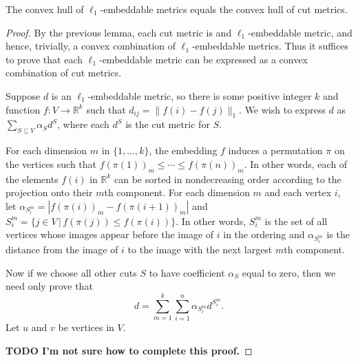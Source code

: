 \documentclass[11pt]{article}
\newcommand{\1}{\mathbf{1}}
\newcommand{\0}{\mathbf{0}}
\begin{document}
\begin{theorem}
  The convex hull of $\ell_1$-embeddable metrics equals the convex hull of cut metrics.
\end{theorem}
\begin{proof}
  By the previous lemma, each cut metric is and $\ell_1$-embeddable metric, and hence, trivially, a convex combination of $\ell_1$-embeddable metrics.
  Thus it suffices to prove that each $\ell_1$-embeddable metric can be expressed as a convex combination of cut metrics.

  Suppose $d$ is an $\ell_1$-embeddable metric, so there is some positive integer $k$ and function $f \colon V \to \mathbb{R}^k$ such that $d_{ij} = \|f(i) - f(j)\|_1$.
  We wish to express $d$ as $\sum_{S \subseteq V} \alpha_S d^S$, where each $d^S$ is the cut metric for $S$.

  For each dimension $m$ in $\{1, \dotsc, k\}$, the embedding $f$ induces a permutation $\pi$ on the vertices such that $f(\pi(1))_m \leq \dotsb \leq f(\pi(n))_m$.
  In other words, each of the elements $f(i)$ in $\mathbb{R}^k$ can be sorted in nondecreasing order according to the projection onto their $m$th component.
  For each dimension $m$ and each vertex $i$, let $\alpha_{S^m_i} = |f(\pi(i))_m - f(\pi(i + 1))_m|$ and $S^m_i = \{ j \in V \,|\, f(\pi(j)) \leq f(\pi(i)) \}$.
  In other words, $S^m_i$ is the set of all vertices whose images appear before the image of $i$ in the ordering and $\alpha_{S^m_i}$ is the distance from the image of $i$ to the image with the next largest $m$th component.

  Now if we choose all other cuts $S$ to have coefficient $\alpha_S$ equal to zero, then we need only prove that
  \begin{equation*}
    d = \sum_{m = 1}^k \sum_{i = 1}^n \alpha_{S^m_i} d^{S^m_i}.
  \end{equation*}
  Let $u$ and $v$ be vertices in $V$.

  \textbf{TODO I'm not sure how to complete this proof.}
\end{proof}
\end{document}
